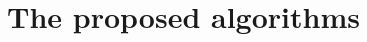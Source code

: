 \documentclass{bmcart}
\newtheorem{definition}{Definition}
\begin{document}
	

 

	\section{The proposed algorithms}\label{sec:rils}

 
 
\end{document}
